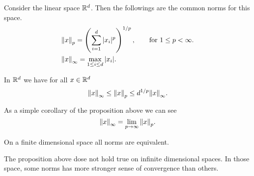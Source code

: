 \begin{summary}
	Consider the linear space $ \mathbb{R}^d $. Then the followings are the common norms for this space.
	\begin{align*}
		&\norm{x}_p = \left( \sum_{i=1}^d |x_i|^p \right)^{1/p}, \qquad \text{for $ 1\leq p < \infty $}.\\
		&\norm{x}_\infty = \max_{1\leq i\leq d} |x_i|.
	\end{align*}
	\begin{proposition}
		In $ \mathbb{R}^d $ we have for all $ x\in \mathbb{R}^d  $
		\[ \norm{x}_\infty \leq \norm{x}_p \leq d^{1/p}\norm{x}_\infty.  \]
	\end{proposition}
	\begin{remark}
		As a simple corollary of the proposition above we can see
		\[ \norm{x}_\infty = \lim_{p\to \infty} \norm{x}_p. \]
	\end{remark}
	\begin{proposition}
		On a finite dimensional space all norms are equivalent.
	\end{proposition}
	\begin{remark}
		The proposition above dose not hold true on infinite dimensional spaces. In those space, some norms has more stronger sense of convergence than others.
	\end{remark}
\end{summary}


